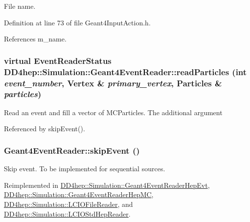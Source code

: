 File name. 

Definition at line 73 of file Geant4InputAction.h.

References m\_\-name.\hypertarget{class_d_d4hep_1_1_simulation_1_1_geant4_event_reader_ac72f293d08b3a2cd9228f56638656613}{
\subsubsection[{readParticles}]{\setlength{\rightskip}{0pt plus 5cm}virtual {\bf EventReaderStatus} DD4hep::Simulation::Geant4EventReader::readParticles (int {\em event\_\-number}, \/  {\bf Vertex} \& {\em primary\_\-vertex}, \/  {\bf Particles} \& {\em particles})}}
\label{class_d_d4hep_1_1_simulation_1_1_geant4_event_reader_ac72f293d08b3a2cd9228f56638656613}


Read an event and fill a vector of MCParticles. The additional argument 

Referenced by skipEvent().\hypertarget{class_d_d4hep_1_1_simulation_1_1_geant4_event_reader_a9381626ad4f4fa20e304414f6654ee03}{
\subsubsection[{skipEvent}]{ Geant4EventReader::skipEvent ()}}
\label{class_d_d4hep_1_1_simulation_1_1_geant4_event_reader_a9381626ad4f4fa20e304414f6654ee03}


Skip event. To be implemented for sequential sources. 

Reimplemented in \hyperlink{class_d_d4hep_1_1_simulation_1_1_geant4_event_reader_hep_evt_a643c4f3e44964b0a5692b5b169ada9e6}{DD4hep::Simulation::Geant4EventReaderHepEvt}, \hyperlink{class_d_d4hep_1_1_simulation_1_1_geant4_event_reader_hep_m_c_a02a4d905385f3b587ffe953e129aad5f}{DD4hep::Simulation::Geant4EventReaderHepMC}, \hyperlink{class_d_d4hep_1_1_simulation_1_1_l_c_i_o_file_reader_a4b14dad308419f968982e216c11bb15a}{DD4hep::Simulation::LCIOFileReader}, and \hyperlink{class_d_d4hep_1_1_simulation_1_1_l_c_i_o_std_hep_reader_a54ae13b39268486b6edc4a7f9a11ada3}{DD4hep::Simulation::LCIOStdHepReader}.

